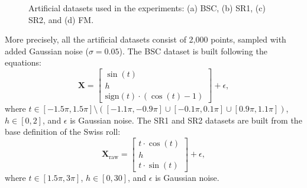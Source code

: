     \begin{figure}
    \centering
    \caption{Artificial datasets used in the experiments: (a) \ac{BSC}, (b) \ac{SR1}, (c) \ac{SR2}, and (d) \ac{FM}.}
    \end{figure}

    More precisely, all the artificial datasets consist of 2,000 points, sampled with added Gaussian noise ($\sigma = 0.05$). The \ac{BSC} dataset is built following the equations:
    \begin{equation}
        \boldsymbol{X} = \begin{bmatrix}
            \sin(t) \\
            h \\
            \text{sign}(t) \cdot (\cos(t) - 1)
        \end{bmatrix} + \epsilon,
    \end{equation}
    where $t \in [-1.5\pi, 1.5\pi] \setminus \left( [-1.1\pi, -0.9\pi] \cup [-0.1\pi, 0.1\pi] \cup [0.9\pi, 1.1\pi] \right)$, $h \in [0, 2]$, and $\epsilon$ is Gaussian noise. The \ac{SR1} and \ac{SR2} datasets are built from the base definition of the Swiss roll:
    \begin{equation}
        \boldsymbol{X}_\text{raw} = \begin{bmatrix}
            t \cdot \cos(t) \\
            h \\
            t \cdot \sin(t)
        \end{bmatrix} + \epsilon,
    \end{equation}
    where $t \in [1.5\pi, 3\pi]$, $h \in [0, 30]$, and $\epsilon$ is Gaussian noise.
    
